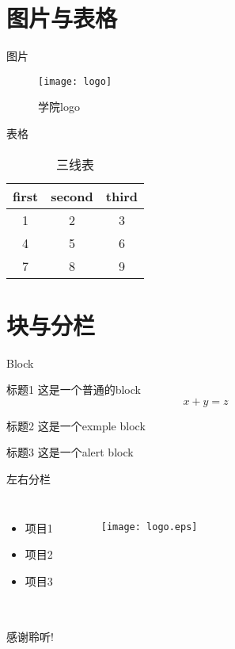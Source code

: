 \documentclass[compress,aspectratio=169]{beamer}
\begin{document}
\section{图片与表格}
\begin{frame}{图片}
	\begin{figure}
		\texttt{[image: logo]}
		\caption{学院logo}
	\end{figure}
\end{frame}

\begin{frame}{表格}
	\begin{table}[!t]  
        \caption{三线表}
        \begin{tabular}{ccc}  
            \toprule   
            first&second&third\\ 
            \midrule       
            1 & 2 & 3 \\ 
            4 & 5 & 6 \\ 
            7 & 8 & 9 \\
            \bottomrule  
    	\end{tabular}
    \end{table}
\end{frame}

\section{块与分栏}

\begin{frame}{Block}
	\begin{block}{标题1}
		这是一个普通的block\\
		$$x+y=z$$
	\end{block}

	\begin{exampleblock}{标题2}
		这是一个exmple block
	\end{exampleblock}

	\begin{alertblock}{标题3}
		这是一个alert block
	\end{alertblock}
\end{frame}

\begin{frame}{左右分栏}
	\begin{columns}
		\begin{itemize}
			\item 项目1
			\item 项目2
			\item 项目3
		\end{itemize}
		\begin{figure}
			\texttt{[image: logo.eps]}
		\end{figure}
	\end{columns}
\end{frame}

\begin{frame}
    \frametitle{}
    \Huge
    \begin{center}
        感谢聆听!
    \end{center}
\end{frame}
\end{document}
